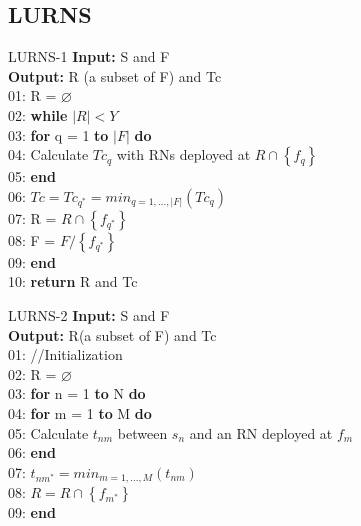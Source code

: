 \documentclass[main.tex]{subfiles}
\begin{document}
\subsection{LURNS}
\begin{frame}{LURNS-1}
\textbf{Input: } S and F\\
\textbf{Output:} R (a subset of F) and Tc\\
01: R = $\varnothing$\\
02: \textbf{while} $|R| < Y$\\
03: \hspace{2mm}\textbf{for} q = 1 \textbf{to} $|F|$ \textbf{do}\\
04: \hspace{4mm}Calculate $Tc_{q}$ with RNs deployed at $R \cap \left\{f_q\right\} $ \\
05: \hspace{2mm}\textbf{end}\\
06: \hspace{2mm}$Tc = Tc_{q^*} = min_{q=1,...,|F|}(Tc_q)$\\
07: \hspace{2mm}R = $R\cap \left\{f_{q^*}\right\}$\\
08: \hspace{2mm}F = $F/\left\{f_{q^*}\right\}$\\
09: \textbf{end}\\
10: \textbf{return} R and Tc
\end{frame}

\begin{frame}{LURNS-2}
\textbf{Input: }S and F\\
\textbf{Output: }R(a subset of F) and Tc\\
01: //Initialization\\
02: R = $\varnothing$\\
03: \textbf{for} n = 1 \textbf{to} N \textbf{do}\\
04: \hspace{2mm}\textbf{for} m = 1 \textbf{to} M \textbf{do}\\
05: \hspace{4mm}Calculate $t_{nm}$ between $s_n$ and an RN deployed at $f_m$\\
06: \hspace{2mm}\textbf{end}\\
07: \hspace{2mm}$t_{nm^*} = min_{m=1,...,M}(t_{nm})$\\
08: \hspace{2mm}$R = R\cap \left\{f_{m^*}\right\}$\\
09: \textbf{end}\\  
\end{frame}
\end{document}
